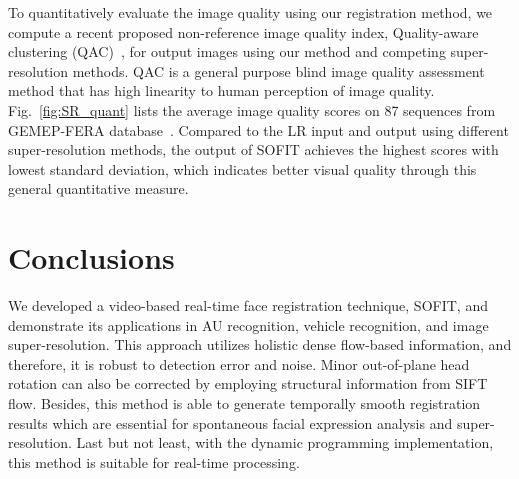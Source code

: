 \documentclass[10pt,journal]{IEEEtran}
\begin{document}
To quantitatively evaluate the image quality using our registration method, we compute a recent proposed non-reference image quality index, Quality-aware clustering (QAC)~\cite{Xue_CVPR13}, for output images using our method and competing super-resolution methods. QAC is a general purpose blind image quality assessment method that has high linearity to human perception of image quality. Fig.~\ref{fig:SR_quant} lists the average image quality scores on 87 sequences from GEMEP-FERA database~\cite{FERA11}. Compared to the LR input and output using different super-resolution methods, the output of SOFIT achieves the highest scores with lowest standard deviation, which indicates better visual quality through this general quantitative measure.

%


\section{Conclusions\label{sec:conclusion}}

We developed a video-based real-time face registration technique, SOFIT, and demonstrate its applications in AU recognition, vehicle recognition, and image super-resolution. This approach utilizes holistic dense flow-based information, and therefore, it is robust to detection error and noise. Minor out-of-plane head rotation can also be corrected by employing structural information from SIFT flow. Besides, this method is able to generate temporally smooth registration results which are essential for spontaneous facial expression analysis and super-resolution. Last but not least, with the dynamic programming implementation, this method is suitable for real-time processing.


%
\end{document}
